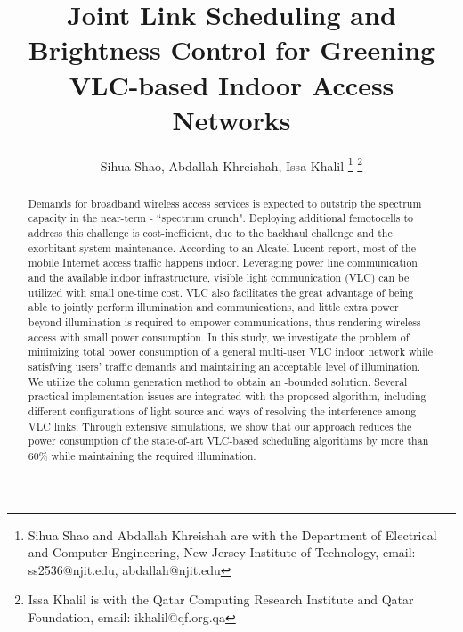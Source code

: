 \documentclass[10pt,journal]{IEEEtran}
\begin{document}
\title{Joint Link Scheduling and Brightness Control for Greening VLC-based Indoor Access Networks}

\author{Sihua Shao, Abdallah Khreishah, Issa Khalil
\thanks{Sihua Shao and Abdallah Khreishah are with the Department of Electrical and Computer Engineering,
New Jersey Institute of Technology, email: ss2536@njit.edu, abdallah@njit.edu}
\thanks{Issa Khalil is with the Qatar Computing Research Institute and Qatar Foundation, email: ikhalil@qf.org.qa}\vspace{-20pt}}

\maketitle

\begin{abstract}
Demands for broadband wireless access services is expected to outstrip the spectrum capacity in the near-term - ``spectrum crunch". Deploying additional femotocells to address this challenge is cost-inefficient, due to the backhaul challenge and the exorbitant system maintenance. According to an Alcatel-Lucent report, most of the mobile Internet access traffic happens indoor. Leveraging power line communication and the available indoor infrastructure, visible light communication (VLC) can be utilized with small one-time cost. VLC also facilitates the great advantage of being able to jointly perform illumination and communications, and little extra power beyond illumination is required to empower communications, thus rendering wireless access with small power consumption. In this study, we investigate the problem of minimizing total power consumption of a general multi-user VLC indoor network while satisfying users' traffic demands and maintaining an acceptable level of illumination. We utilize the column generation method to obtain an -bounded solution. Several practical implementation issues are integrated with the proposed algorithm, including different configurations of light source and ways of resolving the interference among VLC links. Through extensive simulations, we show that our approach reduces the power consumption of the state-of-art VLC-based scheduling algorithms by more than 60\% while maintaining the required illumination.

\end{abstract}
\end{document}
